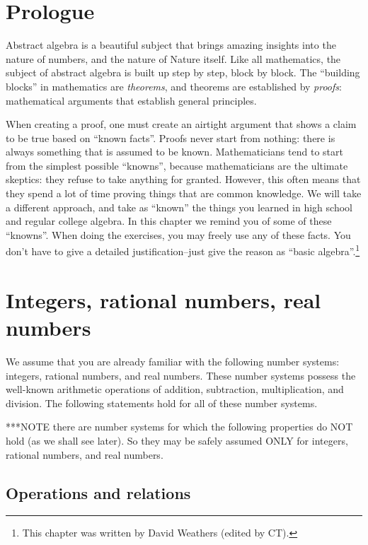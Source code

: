\section{Prologue}
Abstract algebra is a beautiful subject that brings amazing insights into the nature of numbers, and the nature of Nature itself. Like all mathematics, the subject of abstract algebra is built up step by step, block by block. The ``building blocks'' in mathematics  are \emph{theorems}, and theorems are established by \emph{proofs}: mathematical arguments that establish general principles.

When creating a proof, one must create an airtight  argument that shows a claim to be true based on  ``known facts''.  Proofs never start from nothing: there is always something that is assumed to be known.  Mathematicians tend to start from the simplest possible ``knowns'', because mathematicians are the ultimate skeptics: they refuse to take anything for granted. However, this often means that they spend a lot of time proving things that are common knowledge. We will take a different approach, and take as ``known'' the things you learned in high school and regular college algebra. In this chapter  we remind you of some of these ``knowns''.  When doing the exercises, you may freely use any of these facts.  You don't have to give a detailed justification--just give the reason as  ``basic algebra''.\footnote{This chapter was written by David Weathers (edited by CT).}


\section {Integers, rational numbers, real numbers}

We assume that you are already familiar with the following number systems: integers, rational numbers, and real numbers.  These number systems possess the well-known arithmetic operations of addition, subtraction, multiplication, and division. The following statements hold for all of these number systems. 

***NOTE there are number systems for which the following properties do NOT hold (as we shall see later). So they may be safely assumed ONLY for integers, rational numbers, and real numbers.

\subsection{Operations and relations }

